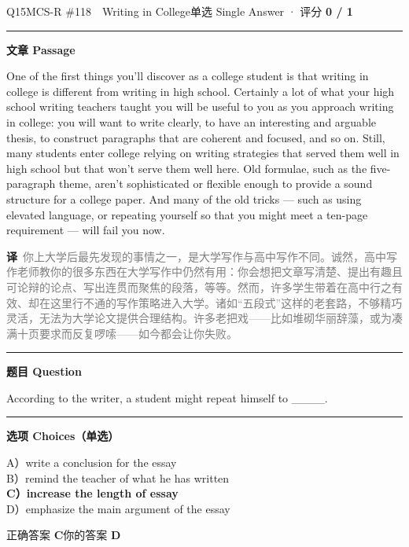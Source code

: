 \documentclass[11pt]{article}
\newcommand{\ptesub}[1]{%
  \par\needspace{2\baselineskip}\smallskip
  {\color{cAccent}\rule[-0.2ex]{3pt}{1.05em}}\hspace{6pt}%
  {\bfseries\color{cHead}#1}\par\nopagebreak\smallskip}
\newcommand{\zh}[1]{{\footnotesize\textcolor{cNote}{\textbf{译}}\ \textcolor{gray}{#1}}}
\begin{document}
\begin{qblock}{Q15\quad MCS-R \#118\ \ Writing in College}{单选 Single Answer · 评分 \textcolor{cAccent}{\bfseries 0 / 1}}
\ptesub{文章 Passage}
\begin{promptbox}
One of the first things you'll discover as a college student is that writing in college is different from writing in high school. Certainly a lot of what your high school writing teachers taught you will be useful to you as you approach writing in college: you will want to write clearly, to have an interesting and arguable thesis, to construct paragraphs that are coherent and focused, and so on. Still, many students enter college relying on writing strategies that served them well in high school but that won't serve them well here. Old formulae, such as the five-paragraph theme, aren't sophisticated or flexible enough to provide a sound structure for a college paper. And many of the old tricks --- such as using elevated language, or repeating yourself so that you might meet a ten-page requirement --- will fail you now.
\end{promptbox}
\zh{你上大学后最先发现的事情之一，是大学写作与高中写作不同。诚然，高中写作老师教你的很多东西在大学写作中仍然有用：你会想把文章写清楚、提出有趣且可论辩的论点、写出连贯而聚焦的段落，等等。然而，许多学生带着在高中行之有效、却在这里行不通的写作策略进入大学。诸如“五段式”这样的老套路，不够精巧灵活，无法为大学论文提供合理结构。许多老把戏——比如堆砌华丽辞藻，或为凑满十页要求而反复啰嗦——如今都会让你失败。}
\ptesub{题目 Question}
\begin{notebox}\small According to the writer, a student might repeat himself to \_\_\_\_.\end{notebox}
\ptesub{选项 Choices（单选）}
{\small
A）write a conclusion for the essay\\
B）remind the teacher of what he has written\\
{\color{cFix}\textbf{C）increase the length of essay}}\\
D）emphasize the main argument of the essay}
\smallskip\par
{\small 正确答案 \textcolor{cFix}{\bfseries C}\qquad 你的答案 {\color{cWrong}\bfseries D}}
\end{qblock}
\end{document}
